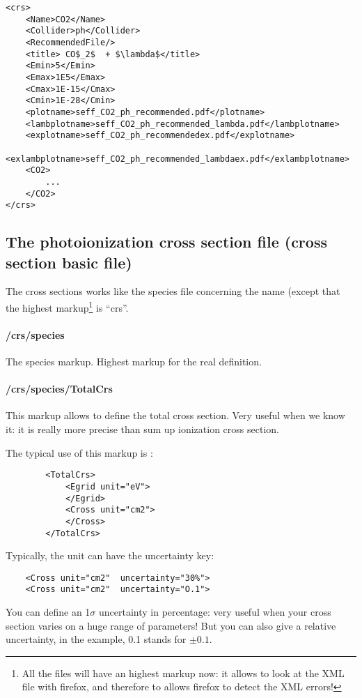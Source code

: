 \begin{verbatim}
<crs>
	<Name>CO2</Name>
	<Collider>ph</Collider>
	<RecommendedFile/>
	<title> CO$_2$  + $\lambda$</title>
	<Emin>5</Emin>
	<Emax>1E5</Emax>
	<Cmax>1E-15</Cmax>
	<Cmin>1E-28</Cmin>
	<plotname>seff_CO2_ph_recommended.pdf</plotname>
	<lambplotname>seff_CO2_ph_recommended_lambda.pdf</lambplotname>
	<explotname>seff_CO2_ph_recommendedex.pdf</explotname>
	<exlambplotname>seff_CO2_ph_recommended_lambdaex.pdf</exlambplotname>
	<CO2>
		...
	</CO2>
</crs>
\end{verbatim}



\subsection{The photoionization cross section file (cross section basic file)}

The cross sections works like the species file concerning the name (except that the highest markup\footnote{All the files will have an highest markup now: it allows to look at the XML file with firefox, and therefore to allows firefox to detect the XML errors!} is ``crs''.

\paragraph{ /crs/species}
The species markup. Highest markup for the real definition.

\paragraph{/crs/species/TotalCrs}
\label{cross_sec_photoioni_total}

This markup allows to define the total cross section. Very useful when we know it: it is really more precise than sum up ionization cross section.

The typical use of this markup is : 
\begin{verbatim}
		<TotalCrs>
			<Egrid unit="eV">
			</Egrid>
			<Cross unit="cm2">
			</Cross>
		</TotalCrs>
\end{verbatim}

Typically, the unit can have the uncertainty key:
\begin{verbatim}
	<Cross unit="cm2"  uncertainty="30%">
	<Cross unit="cm2"  uncertainty="O.1">
\end{verbatim}

You can define an 1$\sigma$ uncertainty in percentage: very useful when your cross section varies on a huge range of parameters!
But you can also give a relative uncertainty, in the example, 0.1 stands for $\pm0.1$.

